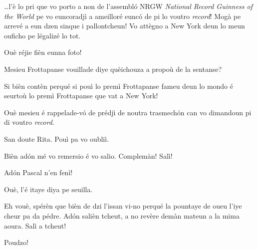 \begin{drama}

\Tissotspeaks \ldots l’è lo pri que vo porto a non de l’assembló NRGW \textit{National Record Guinness of the World} pe vo euncoradjì a ameilloré eunc\'o de pi lo voutro \textit{record}!  Mogà pe arrevé a eun dzen sinque i pallontcheun! Vo attègno a New York deun lo meun ouficho pe légalizé lo tot.

\Ritaspeaks Ouè réjie fièn eunna foto!


\Ritaspeaks Mesieu Frottapanse vouillade diye quèichouza a propoù de la sentanse?

\Cienspeaks Si bièn contèn perqué si pouì lo premì Frottapanse fameu deun lo mondo é seurtoù lo premì Frottapanse que vat a New York!

\Ritaspeaks Ouè mesieu é rappelade-v\'o de prédjì de noutra trasmechón can vo dimandoun pi di voutro \textit{record}.

\Cienspeaks San doute Rita. Pouì pa vo oubliì.

\Ritaspeaks  Bièn ad\'on mé vo remersio é vo salio. Complemàn! Salì!


\Ritaspeaks Adón Pascal n'en fenì!

\Pascalspeaks Ouè, l’é itaye diya pe seuilla.

\Ritaspeaks Eh vouè, spérèn que bièn de dzi l’issan vi-no perqué la pountaye de oueu l’iye cheur pa da pédre. Adón salièn tcheut, a no revère demàn mateun a la mima aoura. Salì a tcheut!

\Pascalspeaks Poudzo!


\ridocliou

\DeriLeRido


\end{drama}
